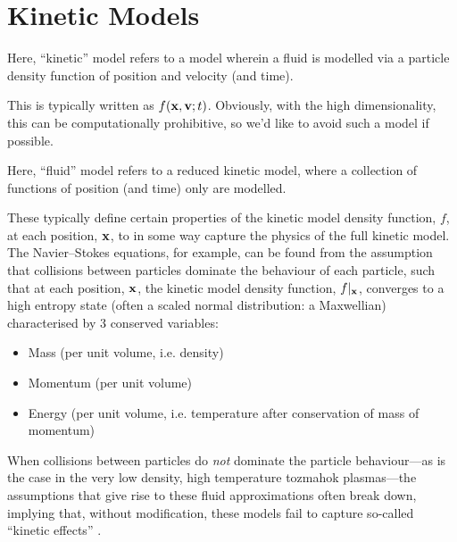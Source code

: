 \section{Kinetic Models}
    
    \begin{definition}
        Here, ``kinetic'' model refers to a model wherein a fluid is modelled via a particle density function of position and velocity (and time).
    \end{definition}
    
    This is typically written as $f(\mathbf{x}, \mathbf{v}; t)$. Obviously, with the high dimensionality, this can be computationally prohibitive, so we'd like to avoid such a model if possible.
    
    
    \begin{definition}
        Here, ``fluid'' model refers to a reduced kinetic model, where a collection of functions of position (and time) only are modelled.
    \end{definition}
    
    These typically define certain properties of the kinetic model density function, $f$, at each position, $\mathbf{x}$, to in some way capture the physics of the full kinetic model. The Navier–Stokes equations, for example, can be found from the assumption that collisions between particles dominate the behaviour of each particle, such that at each position, $\mathbf{x}$, the kinetic model density function, $f|_{\mathbf{x}}$, converges to a high entropy state (often a scaled normal distribution: a Maxwellian) characterised by 3 conserved variables:
    \begin{itemize}
        \item  Mass (per unit volume, i.e. density)
        \item  Momentum (per unit volume)
        \item  Energy (per unit volume, i.e. temperature after conservation of mass of momentum)
    \end{itemize}
    When collisions between particles do \emph{not} dominate the particle behaviour—as is the case in the very low density, high temperature  tozmahok plasmas—the assumptions that give rise to these fluid approximations often break down, implying that, without modification, these models fail to capture so-called ``kinetic effects'' .
    
